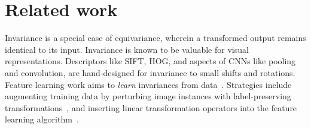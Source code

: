 \documentclass[10pt,twocolumn,letterpaper]{article}
\begin{document}

\vspace{-0.05in}\section{Related work}\label{sec:related}%

Invariance is a special case of equivariance, wherein a transformed output remains identical to its input.  Invariance is known to be valuable for visual representations.  Descriptors like SIFT, HOG, and aspects of CNNs like pooling and convolution, are hand-designed for invariance to small shifts and rotations.  Feature learning work aims to \emph{learn} invariances from data~\cite{Simard1998,simard2003best,vincent2008extracting,sohn2012learning,Dosovitskiy2014}.  Strategies include augmenting training data by perturbing image instances with label-preserving transformations~\cite{simard2003best,vincent2008extracting,Dosovitskiy2014}, and inserting linear transformation operators into the feature learning algorithm~\cite{sohn2012learning}.

\end{document}
